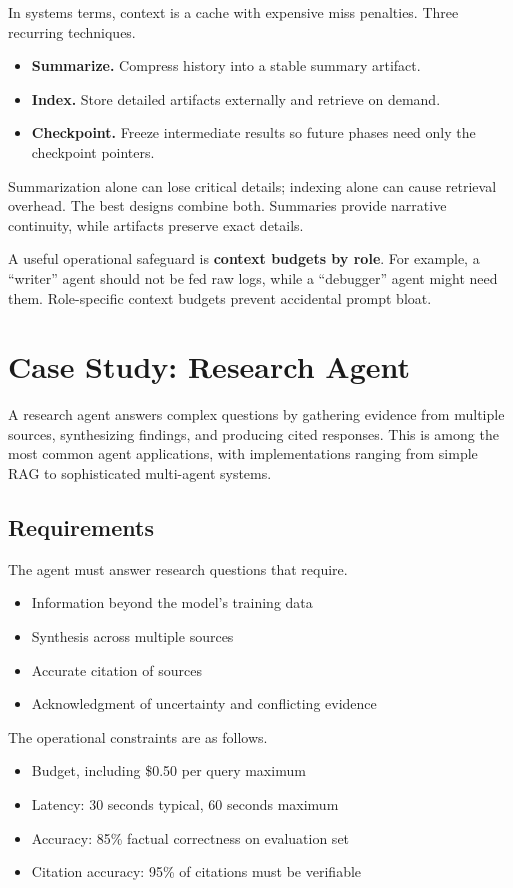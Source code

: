 In systems terms, context is a cache with expensive miss penalties. Three recurring techniques.
\begin{itemize}
\item \textbf{Summarize.} Compress history into a stable summary artifact.
\item \textbf{Index.} Store detailed artifacts externally and retrieve on demand.
\item \textbf{Checkpoint.} Freeze intermediate results so future phases need only the checkpoint pointers.
\end{itemize}
Summarization alone can lose critical details; indexing alone can cause retrieval overhead. The best designs combine both. Summaries provide narrative continuity, while artifacts preserve exact details.

A useful operational safeguard is \textbf{context budgets by role}. For example, a ``writer'' agent should not be fed raw logs, while a ``debugger'' agent might need them. Role-specific context budgets prevent accidental prompt bloat.

\section{Case Study: Research Agent}

A research agent answers complex questions by gathering evidence from multiple sources, synthesizing findings, and producing cited responses. This is among the most common agent applications, with implementations ranging from simple RAG to sophisticated multi-agent systems.

\subsection{Requirements}

The agent must answer research questions that require.
\begin{itemize}
\item Information beyond the model's training data
\item Synthesis across multiple sources
\item Accurate citation of sources
\item Acknowledgment of uncertainty and conflicting evidence
\end{itemize}

The operational constraints are as follows.
\begin{itemize}
\item Budget, including \$0.50 per query maximum
\item Latency: 30 seconds typical, 60 seconds maximum
\item Accuracy: 85\% factual correctness on evaluation set
\item Citation accuracy: 95\% of citations must be verifiable
\end{itemize}

